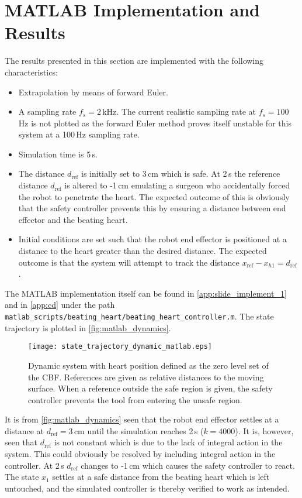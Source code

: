 \section{MATLAB Implementation and Results}
The results presented in this section are implemented with the following characteristics:
\vspace{-2mm}
\begin{itemize}
	\itemsep-0.7mm
\item Extrapolation by means of forward Euler.
\item A sampling rate $f_s=2\,$kHz. The current realistic sampling rate at $f_s=100\,$Hz is not plotted as the forward Euler method proves itself unstable for this system at a 100\,Hz sampling rate.
\item Simulation time is 5\,s.
\item The distance $d_\text{ref}$ is initially set to 3\,cm which is safe. At 2\,s the reference distance $d_\text{ref}$ is altered to -1\,cm emulating a surgeon who accidentally forced the robot to penetrate the heart. The expected outcome of this is obviously that the safety controller prevents this by ensuring a distance between end effector and the beating heart.
\item Initial conditions are set such that the robot end effector is positioned at a distance to the heart greater than the desired distance. The expected outcome is that the system will attempt to track the distance $x_\text{ref}-x_{h1}=d_\text{ref}$.
\end{itemize}
The MATLAB implementation itself can be found in \autoref{app:slide_implement_1} and in \autoref{app:cd} under the path \texttt{matlab\_scripts/beating\_heart/beating\_heart\_controller.m}. The state trajectory is plotted in \autoref{fig:matlab_dynamics}.

\vspace{-2mm}
\begin{figure}[H]
	\center
		\texttt{[image: state\_trajectory\_dynamic\_matlab.eps]}
	\caption{Dynamic system with heart position defined as the zero level set of the CBF. References are given as relative distances to the moving surface. When a reference outside the safe region is given, the safety controller prevents the tool from entering the unsafe region.}
    \label{fig:matlab_dynamics}
\end{figure}
It is from \autoref{fig:matlab_dynamics} seen that the robot end effector settles at a distance at $d_\text{ref}=3\,$cm until the simulation reaches 2\,s ($k=4000$). It is, however, seen that $d_\text{ref}$ is not constant which is due to the lack of integral action in the system. This could obviously be resolved by including integral action in the controller.  At 2\,s $d_\text{ref}$ changes to -1\,cm which causes the safety controller to react. The state $x_1$ settles at a safe distance from the beating heart which is left untouched, and the simulated controller is thereby verified to work as intended.

